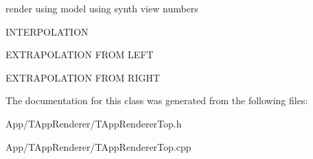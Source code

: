 render using model using synth view numbers 

I\+N\+T\+E\+R\+P\+O\+L\+A\+T\+I\+ON

E\+X\+T\+R\+A\+P\+O\+L\+A\+T\+I\+ON F\+R\+OM L\+E\+FT

E\+X\+T\+R\+A\+P\+O\+L\+A\+T\+I\+ON F\+R\+OM R\+I\+G\+HT 

The documentation for this class was generated from the following files\+:\begin{DoxyCompactItemize}
\item 
App/\+T\+App\+Renderer/T\+App\+Renderer\+Top.\+h\item 
App/\+T\+App\+Renderer/T\+App\+Renderer\+Top.\+cpp\end{DoxyCompactItemize}
